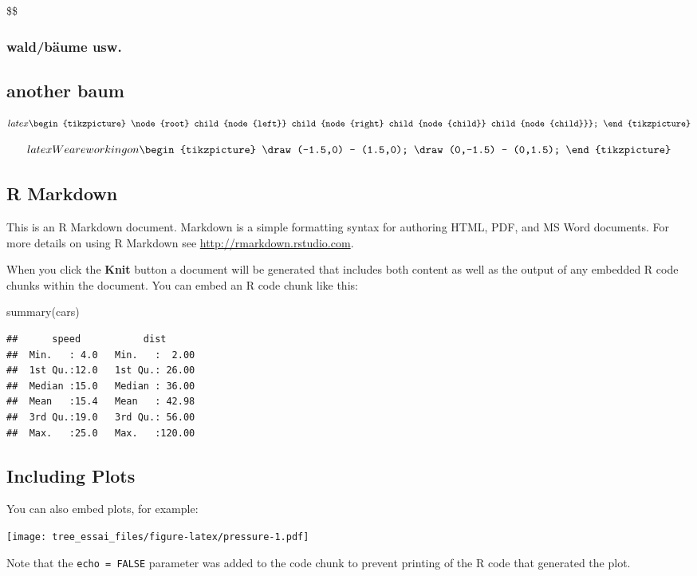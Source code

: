 \documentclass[
]{article}
\newenvironment{Shaded}{\begin{snugshade}}{\end{snugshade}}
\newcommand{\FunctionTok}[1]{\textcolor[rgb]{0.00,0.00,0.00}{#1}}
\newcommand{\NormalTok}[1]{#1}
\begin{document}
\$\$

\hypertarget{waldbuxe4ume-usw.}{%
\subsubsection{wald/bäume usw.}\label{waldbuxe4ume-usw.}}

\hypertarget{another-baum}{%
\subsection{another baum}\label{another-baum}}

\[latex  
\begin{tikzpicture}
\node {root} 
child {node {left}} 
child {node {right} 
child {node {child}} 
child {node {child}}};
\end {tikzpicture}\]

\[latex  
We are working on
\begin{tikzpicture}
\draw (-1.5,0) -- (1.5,0);
\draw (0,-1.5) -- (0,1.5);
\end{tikzpicture}\]

\hypertarget{r-markdown}{%
\subsection{R Markdown}\label{r-markdown}}

This is an R Markdown document. Markdown is a simple formatting syntax
for authoring HTML, PDF, and MS Word documents. For more details on
using R Markdown see \url{http://rmarkdown.rstudio.com}.

When you click the \textbf{Knit} button a document will be generated
that includes both content as well as the output of any embedded R code
chunks within the document. You can embed an R code chunk like this:

\begin{Shaded}
\begin{Highlighting}[]
\FunctionTok{summary}\NormalTok{(cars)}
\end{Highlighting}
\end{Shaded}

\begin{verbatim}
##      speed           dist       
##  Min.   : 4.0   Min.   :  2.00  
##  1st Qu.:12.0   1st Qu.: 26.00  
##  Median :15.0   Median : 36.00  
##  Mean   :15.4   Mean   : 42.98  
##  3rd Qu.:19.0   3rd Qu.: 56.00  
##  Max.   :25.0   Max.   :120.00
\end{verbatim}

\hypertarget{including-plots}{%
\subsection{Including Plots}\label{including-plots}}

You can also embed plots, for example:

\texttt{[image: tree\_essai\_files/figure-latex/pressure-1.pdf]}

Note that the \texttt{echo\ =\ FALSE} parameter was added to the code
chunk to prevent printing of the R code that generated the plot.
\end{document}
